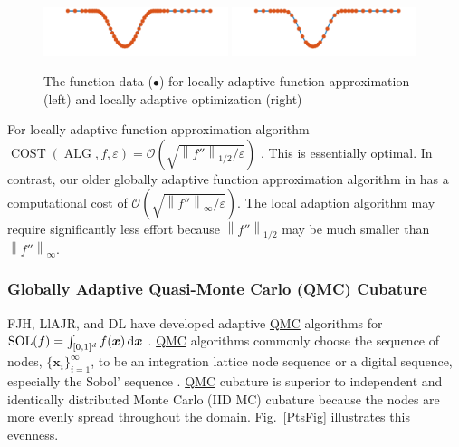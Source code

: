 \documentclass[11pt]{NSFamsart}
\newcommand{\QMC}{\hyperlink{QMClink}{QMC}\xspace}
\DeclareMathOperator{\cost}{COST}
\DeclareMathOperator{\SOL}{SOL}
\DeclareMathOperator{\ALG}{ALG}
\newcommand{\bx}{{\boldsymbol{x}}}
\def\dif{\textup{d}}
\newcommand{\norm}[2][{}]{\ensuremath{\left \lVert #2 \right \rVert}_{#1}}
\newcommand{\Order}{\mathcal{O}}
\begin{document}
\begin{figure}[h]
	\centering
	\vspace{-1ex}
	\includegraphics[width = 0.48\textwidth]{ProgramsImages/sampling-funappxg.png}
	\includegraphics[width = 0.48\textwidth]{ProgramsImages/sampling-funming.png}
	
	\vspace{-2ex}
	\caption{The function data ({\color{MATLABOrange}$\bullet$}) for  locally adaptive 
	function approximation  (left) and locally adaptive optimization (right) \label{localadaptfig}}
\end{figure}


For locally adaptive function approximation algorithm 
$\cost(\ALG,f,\varepsilon) = \Order\left(\sqrt{\norm[1/2]{f''}/\varepsilon} \right)$ \cite{ChoEtal17a}.  This is essentially optimal. In contrast, 
our older globally adaptive function approximation algorithm in \cite{HicEtal14b} has a 
computational cost of $\Order\left(\sqrt{\norm[\infty]{f''}/\varepsilon} \right)$.  The local adaption algorithm may require significantly less effort because $\norm[1/2]{f''}$ may be much smaller than 
$\norm[\infty]{f''}$.

\subsubsection[QMCsec]{Globally  Adaptive Quasi-Monte Carlo (QMC) 
Cubature} \hypertarget{QMClink}{}
\label{sec:QMC}
FJH, LlAJR, and DL have 
developed adaptive \QMC algorithms for $\SOL(f) = \int_{[0,1]^d} f(\bx) \, \dif \bx$  \cite{HicJim16a,JimHic16a}.  \QMC algorithms  commonly 
choose the 
sequence of nodes, $\{\bx_i\}_{i=1}^\infty$, to be an integration lattice node sequence  or a digital 
sequence, especially the Sobol' sequence \cite{DicEtal14a}.  \QMC cubature is superior to 
independent and identically distributed Monte Carlo (\hypertarget{IIDMClink}{IID MC}) cubature 
because the nodes are more 
evenly spread throughout the domain.   Fig.\ \ref{PtsFig} illustrates this evenness.
\end{document}
